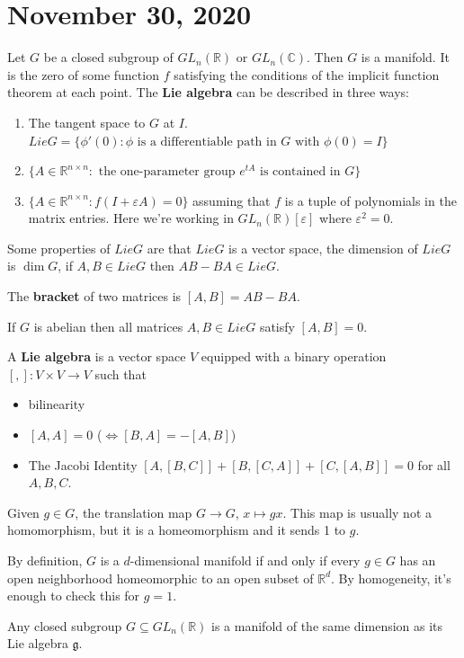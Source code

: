 \documentclass{article}
\newcommand{\vocab}[1]{\textbf{\color{blue!90}\boldmath #1}}
\newcommand{\C}{\mathbb{C}}
\newcommand{\R}{\mathbb{R}}
\newcommand{\eps}{\varepsilon}
\newcommand{\ra}[1][]{\xrightarrow{#1}}
\begin{document}
\section{November 30, 2020}
Let $G$ be a closed subgroup of $GL_n(\R)$ or $GL_n(\C)$. Then $G$ is a manifold. It is the zero of some function $f$ satisfying the conditions of the implicit function theorem at each point. The \vocab{Lie algebra} can be described in three ways:
\begin{enumerate}
    \item The tangent space to $G$ at $I$. $Lie G=\{\phi'(0):\phi\textrm{ is a differentiable path in }G\textrm{ with }\phi(0)=I\}$
    \item $\{A\in\R^{n\times n}:\textrm{ the one-parameter group }e^{tA}\textrm{ is contained in }G\}$
    \item $\{A\in\R^{n\times n}:f(I+\eps A)=0\}$ assuming that $f$ is a tuple of polynomials in the matrix entries. Here we're working in $GL_n(\R)[\eps]$ where $\eps^2=0$.
\end{enumerate}
Some properties of $Lie G$ are that $Lie G$ is a vector space, the dimension of $Lie G$ is $\dim G$, if $A,B\in Lie G$ then $AB-BA\in Lie G$.
\begin{definition}
The \vocab{bracket} of two matrices is $[A,B]=AB-BA$.
\end{definition}
If $G$ is abelian then all matrices $A,B\in Lie G$ satisfy $[A,B]=0$.
\begin{definition}
A \vocab{Lie algebra} is a vector space $V$ equipped with a binary operation $[,]:V\times V\ra V$ such that
\begin{itemize}
    \item bilinearity
    \item $[A,A]=0$ ($\iff [B,A]=-[A,B]$)
    \item The Jacobi Identity $[A,[B,C]]+[B,[C,A]]+[C,[A,B]]=0$ for all $A,B,C$.
\end{itemize}
\end{definition}
Given $g\in G$, the translation map $G\ra G$, $x\mapsto gx$. This map is usually not a homomorphism, but it is a homeomorphism and it sends 1 to $g$.
\begin{example}
By definition, $G$ is a $d$-dimensional manifold if and only if every $g\in G$ has an open neighborhood homeomorphic to an open subset of $\R^d$. By homogeneity, it's enough to check this for $g=1$.
\end{example}
\begin{fact}
Any closed subgroup $G\subseteq GL_n(\R)$ is a manifold of the same dimension as its Lie algebra $\mathfrak g$.
\end{fact}
\end{document}
